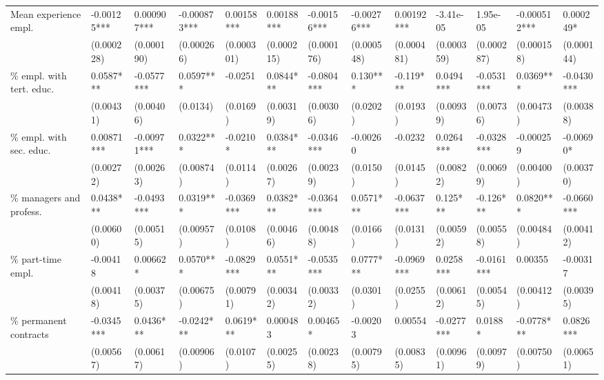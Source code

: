 \documentclass[12pt]{article}
\begin{document}
\begin{sidewaystable}[htb]
{\begin{threeparttable}
\begin{tabular}{l*{12}{l}}
Mean experience empl.           &       -0.00125*** & 0.000907*** & -0.000873*** & 0.00158*** & 0.00188*** & -0.00156*** & -0.00276*** & 0.00192*** & -3.41e-05  & 1.95e-05   & -0.000512*** & 0.000249*  \\
                                &       (0.000228)  & (0.000190)  & (0.000266)   & (0.000301) & (0.000215) & (0.000176)  & (0.000548)  & (0.000481) & (0.000359) & (0.000287) & (0.000158)   & (0.000144) \\[1ex]
\% empl. with tert. educ.       &       0.0587***   & -0.0577***  & 0.0597***    & -0.0251    & 0.0844***  & -0.0804***  & 0.130***    & -0.119***  & 0.0494***  & -0.0531*** & 0.0369***    & -0.0430*** \\
                                &       (0.00431)   & (0.00406)   & (0.0134)     & (0.0169)   & (0.00319)  & (0.00306)   & (0.0202)    & (0.0193)   & (0.00939)  & (0.00736)  & (0.00473)    & (0.00388)  \\[1ex]
\% empl. with sec. educ.        &       0.00871***  & -0.00971*** & 0.0322***    & -0.0210*   & 0.0384***  & -0.0346***  & -0.00260    & -0.0232    & 0.0264***  & -0.0328*** & -0.000259    & -0.00690*  \\
                                &       (0.00272)   & (0.00263)   & (0.00874)    & (0.0114)   & (0.00267)  & (0.00239)   & (0.0150)    & (0.0145)   & (0.00822)  & (0.00699)  & (0.00400)    & (0.00370)  \\[1ex]
\% managers and profess.        &       0.0438***   & -0.0493***  & 0.0319***    & -0.0369*** & 0.0382***  & -0.0364***  & 0.0571***   & -0.0637*** & 0.125***   & -0.126***  & 0.0820***    & -0.0660*** \\
                                &       (0.00600)   & (0.00515)   & (0.00957)    & (0.0108)   & (0.00466)  & (0.00488)   & (0.0166)    & (0.0131)   & (0.00592)  & (0.00558)  & (0.00484)    & (0.00412)  \\[1ex]
\% part-time empl.              &       -0.00418    & 0.00662*    & 0.0570***    & -0.0829*** & 0.0551***  & -0.0535***  & 0.0777***   & -0.0969*** & 0.0258***  & -0.0161*** & 0.00355      & -0.00317   \\
                                &       (0.00418)   & (0.00375)   & (0.00675)    & (0.00791)  & (0.00342)  & (0.00332)   & (0.0301)    & (0.0255)   & (0.00612)  & (0.00545)  & (0.00412)    & (0.00395)  \\[1ex]
\% permanent contracts          &       -0.0345***  & 0.0436***   & -0.0242***   & 0.0619***  & 0.000483   & 0.00465*    & -0.00203    & 0.00554    & -0.0277*** & 0.0188*    & -0.0778***   & 0.0826***  \\
                                &       (0.00567)   & (0.00617)   & (0.00906)    & (0.0107)   & (0.00255)  & (0.00238)   & (0.00795)   & (0.00835)  & (0.00961)  & (0.00979)  & (0.00750)    & (0.00651)  \\[1ex]


\end{tabular}
\end{threeparttable}}
\end{sidewaystable}
\end{document}
